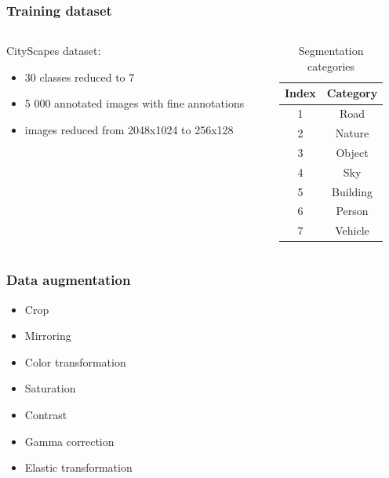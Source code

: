 \documentclass[10pt,xcolor=pdflatex,hyperref={unicode}]{beamer}
\begin{document}
\begin{frame}\frametitle{Training dataset}
    \begin{columns}[T]
        \begin{column}{.5\textwidth}
            CityScapes dataset:
            \begin{itemize}
                \item 30 classes reduced to 7
                
                \item 5 000 annotated images with fine annotations
                
                \item images reduced from 2048x1024 to 256x128
            \end{itemize}
        \end{column}
        \begin{column}{.5\textwidth}
            \begin{table}[H]\centering
                \begin{tabular}{ |c|c| }
                    \hline
                    Index & Category \\
                    \hline
                    1 & Road \\
                    2 & Nature \\
                    3 & Object \\
                    4 & Sky \\
                    5 & Building \\
                    6 & Person \\
                    7 & Vehicle \\
                    \hline
                \end{tabular}
                \caption{Segmentation categories}
                \label{table:categories}
            \end{table}
        \end{column}
    \end{columns}
    
\end{frame}

\begin{frame}\frametitle{Data augmentation}
    \begin{itemize}
        \item Crop
        \item Mirroring
        \item Color transformation
        \item Saturation
        \item Contrast
        \item Gamma correction
        \item Elastic transformation
    \end{itemize}
\end{frame}
\end{document}
